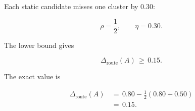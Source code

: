 \documentclass{article} %
\begin{document}
Each static candidate misses one cluster by \(0.30\):

\begin{equation}
\label{eq:app-fifth-margin-example-rhoeta}
\rho=\frac{1}{2},
\qquad
\eta=0.30.
\end{equation}

The lower bound gives

\begin{equation}
\label{eq:app-fifth-margin-example-bound}
\Delta_{\mathrm{route}}(A)\,\ge\, 0.15.
\end{equation}

The exact value is

\begin{align}
\label{eq:app-fifth-margin-example-exact}
\Delta_{\mathrm{route}}(A)
&\,=\,
0.80-\frac{1}{2}(0.80+0.50)
\\
&\,=\,
0.15.
\end{align}
\end{document}
